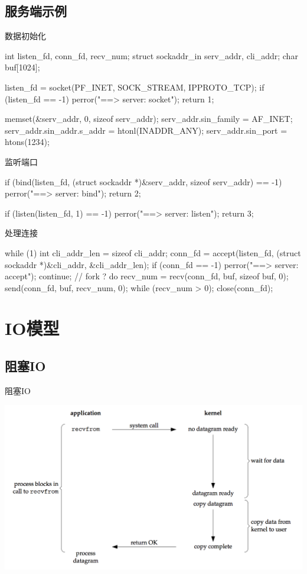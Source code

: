 \documentclass[UTF8]{beamer}
\begin{document}
\subsection{服务端示例}
\begin{frame}[fragile]{数据初始化}
  \begin{ccode}
    int listen_fd, conn_fd, recv_num;
    struct sockaddr_in serv_addr, cli_addr;
    char buf[1024];

    listen_fd = socket(PF_INET, SOCK_STREAM, IPPROTO_TCP);
    if (listen_fd == -1) {
      perror("==> server: socket");
      return 1;
    }

    memset(&serv_addr, 0, sizeof serv_addr);
    serv_addr.sin_family = AF_INET;
    serv_addr.sin_addr.s_addr = htonl(INADDR_ANY);
    serv_addr.sin_port = htons(1234);
  \end{ccode}
\end{frame}
\begin{frame}[fragile]{监听端口}
  \begin{ccode}
    if (bind(listen_fd, (struct sockaddr *)&serv_addr, sizeof serv_addr) == -1) {
      perror("==> server: bind");
      return 2;
    }

    if (listen(listen_fd, 1) == -1) {
      perror("==> server: listen");
      return 3;
    }
  \end{ccode}
\end{frame}
\begin{frame}[fragile]{处理连接}
  \begin{ccode}
    while (1) {
      int cli_addr_len = sizeof cli_addr;
      conn_fd = accept(listen_fd, (struct sockaddr *)&cli_addr, &cli_addr_len);
      if (conn_fd == -1) {
        perror("==> server: accept");
        continue;
      }
      // fork ?
      do {
        recv_num = recv(conn_fd, buf, sizeof buf, 0);
        send(conn_fd, buf, recv_num, 0);
      } while (recv_num > 0);
      close(conn_fd);
    }
  \end{ccode}
\end{frame}
\section{IO模型}
\subsection{阻塞IO}
\begin{frame}{阻塞IO}
  \centerline{\includegraphics[width=\textwidth]{img/block.png}}
\end{frame}
\end{document}

